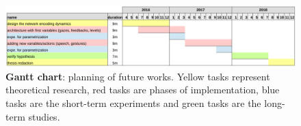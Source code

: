 \documentclass[10pt,a4paper]{article}
\begin{document}
\begin{figure}[h]
\centering
\includegraphics[width=1.\columnwidth]{gantt}
\caption{\small \textbf{Gantt chart}: planning of future works. Yellow tasks represent theoretical research, red tasks are phases of implementation, blue tasks are the short-term experiments and green tasks are the long-term studies.}
\label{gantt}
\end{figure} 



\small
 
\end{document}
